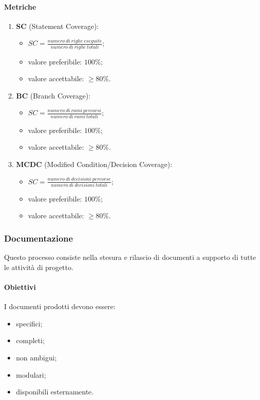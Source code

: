         \paragraph{Metriche}
            \begin{enumerate}
                \item \textbf{SC} (Statement Coverage):
                \begin{itemize}
                    \item $SC = \frac{numero\ di\ righe\ eseguite}{numero\ di\ righe\ totali}$;
                    \item valore preferibile: $100\%$;
                    \item valore accettabile: $\geq 80\%$.
                \end{itemize}
                \item \textbf{BC} (Branch Coverage):
                \begin{itemize}
                    \item $SC = \frac{numero\ di\ rami\ percorsi}{numero\ di\ rami\ totali}$;
                    \item valore preferibile: $100\%$;
                    \item valore accettabile: $\geq 80\%$.
                \end{itemize}
                \item \textbf{MCDC} (Modified Condition/Decision Coverage):
                \begin{itemize}
                    \item $SC = \frac{numero\ di\ decisioni\ percorse}{numero\ di\ decisioni\ totali}$;
                    \item valore preferibile: $100\%$;
                    \item valore accettabile: $\geq 80\%$.
                \end{itemize}
            \end{enumerate}
    \subsubsection{Documentazione}
        Questo processo consiste nella stesura e rilascio di documenti a supporto di tutte le attività di progetto.
        \paragraph{Obiettivi}
            I documenti prodotti devono essere:
            \begin{itemize}
                \item specifici;
                \item completi;
                \item non ambigui;
                \item modulari;
                \item disponibili esternamente.
            \end{itemize}
